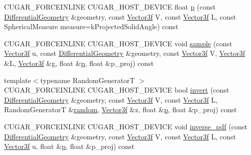 \begin{DoxyCompactItemize}
\item 
C\+U\+G\+A\+R\+\_\+\+F\+O\+R\+C\+E\+I\+N\+L\+I\+NE C\+U\+G\+A\+R\+\_\+\+H\+O\+S\+T\+\_\+\+D\+E\+V\+I\+CE float \hyperlink{structcugar_1_1_g_g_x_smith_bsdf_a8cc733f9120c3b196b54a8df79116dfc}{p} (const \hyperlink{structcugar_1_1_differential_geometry}{Differential\+Geometry} \&geometry, const \hyperlink{structcugar_1_1_vector}{Vector3f} V, const \hyperlink{structcugar_1_1_vector}{Vector3f} L, const Spherical\+Measure measure=k\+Projected\+Solid\+Angle) const
\item 
C\+U\+G\+A\+R\+\_\+\+F\+O\+R\+C\+E\+I\+N\+L\+I\+NE C\+U\+G\+A\+R\+\_\+\+H\+O\+S\+T\+\_\+\+D\+E\+V\+I\+CE void \hyperlink{structcugar_1_1_g_g_x_smith_bsdf_a91fd12957c150cf4910936815a4f3e82}{sample} (const \hyperlink{structcugar_1_1_vector}{Vector3f} u, const \hyperlink{structcugar_1_1_differential_geometry}{Differential\+Geometry} \&geometry, const \hyperlink{structcugar_1_1_vector}{Vector3f} V, \hyperlink{structcugar_1_1_vector}{Vector3f} \&L, \hyperlink{structcugar_1_1_vector}{Vector3f} \&g, float \&\hyperlink{structcugar_1_1_g_g_x_smith_bsdf_a8cc733f9120c3b196b54a8df79116dfc}{p}, float \&p\+\_\+proj) const
\item 
{\footnotesize template$<$typename Random\+GeneratorT $>$ }\\C\+U\+G\+A\+R\+\_\+\+F\+O\+R\+C\+E\+I\+N\+L\+I\+NE C\+U\+G\+A\+R\+\_\+\+H\+O\+S\+T\+\_\+\+D\+E\+V\+I\+CE bool \hyperlink{structcugar_1_1_g_g_x_smith_bsdf_a648521001aed72b2ce05694cb0359348}{invert} (const \hyperlink{structcugar_1_1_differential_geometry}{Differential\+Geometry} \&geometry, const \hyperlink{structcugar_1_1_vector}{Vector3f} V, const \hyperlink{structcugar_1_1_vector}{Vector3f} L, Random\+GeneratorT \&\hyperlink{group___sampling_module_gaec17bbbfd36295353081b7b4480d933d}{random}, \hyperlink{structcugar_1_1_vector}{Vector3f} \&z, float \&\hyperlink{structcugar_1_1_g_g_x_smith_bsdf_a8cc733f9120c3b196b54a8df79116dfc}{p}, float \&p\+\_\+proj) const
\item 
C\+U\+G\+A\+R\+\_\+\+F\+O\+R\+C\+E\+I\+N\+L\+I\+NE C\+U\+G\+A\+R\+\_\+\+H\+O\+S\+T\+\_\+\+D\+E\+V\+I\+CE void \hyperlink{structcugar_1_1_g_g_x_smith_bsdf_abfad320c3211a3cd3bfb3004002ef342}{inverse\+\_\+pdf} (const \hyperlink{structcugar_1_1_differential_geometry}{Differential\+Geometry} \&geometry, const \hyperlink{structcugar_1_1_vector}{Vector3f} V, const \hyperlink{structcugar_1_1_vector}{Vector3f} L, const \hyperlink{structcugar_1_1_vector}{Vector3f} u, float \&\hyperlink{structcugar_1_1_g_g_x_smith_bsdf_a8cc733f9120c3b196b54a8df79116dfc}{p}, float \&p\+\_\+proj) const
\end{DoxyCompactItemize}
